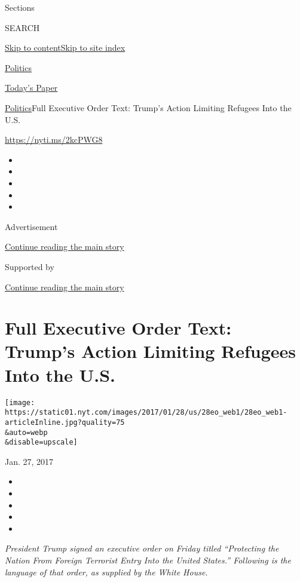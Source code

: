 Sections

SEARCH

\protect\hyperlink{site-content}{Skip to
content}\protect\hyperlink{site-index}{Skip to site index}

\href{https://www.nytimes.com/section/politics}{Politics}

\href{https://myaccount.nytimes.com/auth/login?response_type=cookie\&client_id=vi}{}

\href{https://www.nytimes.com/section/todayspaper}{Today's Paper}

\href{/section/politics}{Politics}\textbar{}Full Executive Order Text:
Trump's Action Limiting Refugees Into the U.S.

\url{https://nyti.ms/2kcPWG8}

\begin{itemize}
\item
\item
\item
\item
\item
\end{itemize}

Advertisement

\protect\hyperlink{after-top}{Continue reading the main story}

Supported by

\protect\hyperlink{after-sponsor}{Continue reading the main story}

\hypertarget{full-executive-order-text-trumps-action-limiting-refugees-into-the-us}{%
\section{Full Executive Order Text: Trump's Action Limiting Refugees
Into the
U.S.}\label{full-executive-order-text-trumps-action-limiting-refugees-into-the-us}}

\texttt{[image: https://static01.nyt.com/images/2017/01/28/us/28eo\_web1/28eo\_web1-articleInline.jpg?quality=75\\\&auto=webp\\\&disable=upscale]}

Jan. 27, 2017

\begin{itemize}
\item
\item
\item
\item
\item
\end{itemize}

\emph{President Trump signed an executive order on Friday titled
``Protecting the Nation From Foreign Terrorist Entry Into the United
States.'' Following is the language of that order, as supplied by the
White House.}

